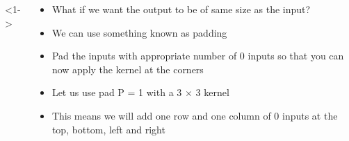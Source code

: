 \begin{frame}
\begin{columns}
		<1->
		\begin{overlayarea}{\textwidth}{\textheight}
			\footnotesize{
				\begin{itemize}
					\justifying
					\item<1-> What if we want the output to be of same size as the input?
					\item<2-> We can use something known as padding
					\item<3-> Pad the inputs with appropriate number of 0 inputs so that you can now apply the kernel at the corners
					\item<4-> Let us use pad P = 1 with a 3 $\times$ 3 kernel
					\item<5-> This means we will add one row and one column of 0 inputs at the top, bottom, left and right
				\end{itemize}}
		\end{overlayarea}
	\end{columns}
\end{frame}


